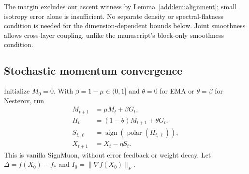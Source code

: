 The margin excludes our ascent witness by Lemma~\ref{add:lem:alignment};
small isotropy error alone is insufficient. No separate density or
spectral-flatness condition is needed for the dimension-dependent bounds
below. Joint smoothness allows cross-layer coupling, unlike the manuscript's
block-only smoothness condition.

\subsection{Stochastic momentum convergence}
Initialize $M_0=0$. With $\beta=1-\mu\in(0,1]$ and
$\theta=0$ for EMA or $\theta=\beta$ for Nesterov, run
\begin{align}
 M_{t+1}&=\mu M_t+\beta G_t,\nonumber\\
 H_t&=(1-\theta)M_{t+1}+\theta G_t,\label{add:eq:method}\\
 S_{t,\ell}&=\operatorname{sign}(\operatorname{polar}(H_{t,\ell})),\nonumber\\
 X_{t+1}&=X_t-\eta S_t.\nonumber
\end{align}
This is vanilla SignMuon, without error feedback or weight decay.
Let $\Delta=f(X_0)-f_*$ and $I_0=\|\nabla f(X_0)\|_F$.

